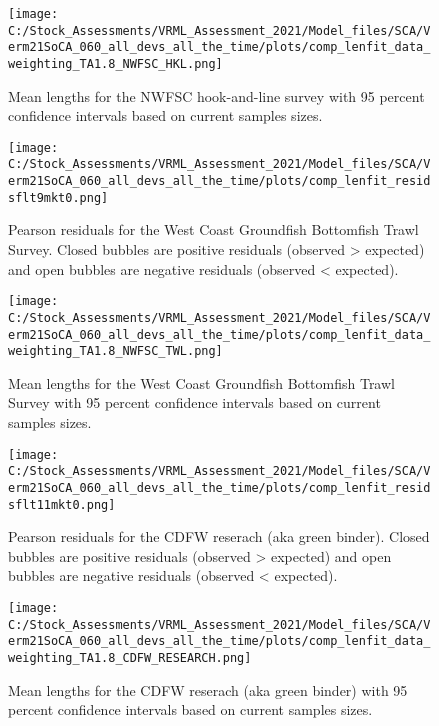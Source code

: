 \documentclass[11pt,
  english,
  a4paper,
]{article}
\begin{document}
\begin{figure}
\centering
\texttt{[image: C:/Stock\_Assessments/VRML\_Assessment\_2021/Model\_files/SCA/Verm21SoCA\_060\_all\_devs\_all\_the\_time/plots/comp\_lenfit\_data\_weighting\_TA1.8\_NWFSC\_HKL.png]}
\caption{Mean lengths for the NWFSC hook-and-line survey with 95 percent confidence intervals based on current samples sizes.\label{fig:mean-len-fit-NWFSC-HKL}}
\end{figure}

\begin{figure}
\centering
\texttt{[image: C:/Stock\_Assessments/VRML\_Assessment\_2021/Model\_files/SCA/Verm21SoCA\_060\_all\_devs\_all\_the\_time/plots/comp\_lenfit\_residsflt9mkt0.png]}
\caption{Pearson residuals for the West Coast Groundfish Bottomfish Trawl Survey. Closed bubbles are positive residuals (observed \textgreater{} expected) and open bubbles are negative residuals (observed \textless{} expected).\label{fig:len-pearson-NWFSC-TWL}}
\end{figure}

\begin{figure}
\centering
\texttt{[image: C:/Stock\_Assessments/VRML\_Assessment\_2021/Model\_files/SCA/Verm21SoCA\_060\_all\_devs\_all\_the\_time/plots/comp\_lenfit\_data\_weighting\_TA1.8\_NWFSC\_TWL.png]}
\caption{Mean lengths for the West Coast Groundfish Bottomfish Trawl Survey with 95 percent confidence intervals based on current samples sizes.\label{fig:mean-len-fit-NWFSC-TWL}}
\end{figure}

\begin{figure}
\centering
\texttt{[image: C:/Stock\_Assessments/VRML\_Assessment\_2021/Model\_files/SCA/Verm21SoCA\_060\_all\_devs\_all\_the\_time/plots/comp\_lenfit\_residsflt11mkt0.png]}
\caption{Pearson residuals for the CDFW reserach (aka green binder). Closed bubbles are positive residuals (observed \textgreater{} expected) and open bubbles are negative residuals (observed \textless{} expected).\label{fig:len-pearson-CDFW-RESEARCH}}
\end{figure}

\begin{figure}
\centering
\texttt{[image: C:/Stock\_Assessments/VRML\_Assessment\_2021/Model\_files/SCA/Verm21SoCA\_060\_all\_devs\_all\_the\_time/plots/comp\_lenfit\_data\_weighting\_TA1.8\_CDFW\_RESEARCH.png]}
\caption{Mean lengths for the CDFW reserach (aka green binder) with 95 percent confidence intervals based on current samples sizes.\label{fig:mean-len-fit-CDFW-RESEARCH}}
\end{figure}
\end{document}
